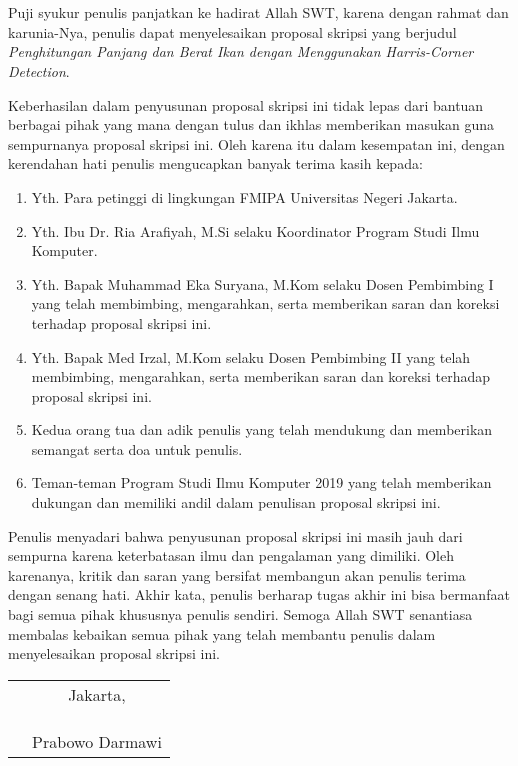 \chapter*{}

Puji syukur penulis panjatkan ke hadirat Allah SWT, karena dengan rahmat dan
karunia-Nya, penulis dapat menyelesaikan proposal skripsi yang berjudul
\textit{Penghitungan Panjang dan Berat Ikan dengan Menggunakan Harris-Corner Detection}.

Keberhasilan dalam penyusunan proposal skripsi ini tidak lepas dari bantuan
berbagai pihak yang mana dengan tulus dan ikhlas memberikan masukan guna
sempurnanya proposal skripsi ini. Oleh karena itu dalam kesempatan ini, dengan
kerendahan hati penulis mengucapkan banyak terima kasih kepada:

\begin{enumerate}

	\item{Yth. Para petinggi di lingkungan FMIPA Universitas Negeri Jakarta.}
	\item{Yth. Ibu Dr. Ria Arafiyah, M.Si selaku Koordinator Program Studi Ilmu
		Komputer.}
	\item{Yth. Bapak Muhammad Eka Suryana, M.Kom selaku Dosen Pembimbing I yang
		telah membimbing, mengarahkan, serta memberikan saran dan koreksi terhadap
		proposal skripsi ini.}
	\item{Yth. Bapak Med Irzal, M.Kom selaku Dosen Pembimbing II yang telah
		membimbing, mengarahkan, serta memberikan saran dan koreksi terhadap
		proposal skripsi ini.}
	\item{Kedua orang tua dan adik penulis yang telah mendukung dan memberikan 
		semangat serta doa untuk penulis.}
	\item{Teman-teman Program Studi Ilmu Komputer 2019 yang telah memberikan 
		dukungan dan memiliki andil dalam penulisan proposal skripsi ini.}
	
\end{enumerate}

Penulis menyadari bahwa penyusunan proposal skripsi ini masih jauh dari sempurna
karena keterbatasan ilmu dan pengalaman yang dimiliki. Oleh karenanya, kritik
dan saran yang bersifat membangun akan penulis terima dengan senang hati. Akhir
kata, penulis berharap tugas akhir ini bisa bermanfaat bagi semua pihak
khususnya penulis sendiri. Semoga Allah SWT senantiasa membalas kebaikan semua
pihak yang telah membantu penulis dalam menyelesaikan proposal skripsi ini.

\vspace{4cm}

\begin{tabular}{p{7.5cm}c}
	&Jakarta, \\
	&\\
	&\\
	&\\
	&Prabowo Darmawi
\end{tabular}
